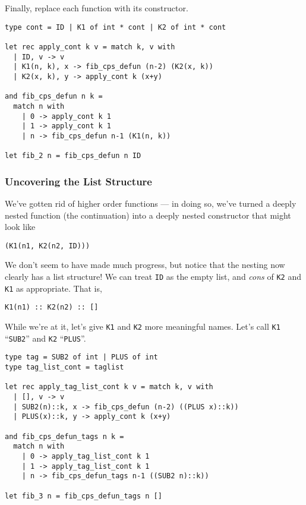 Finally, replace each function with its constructor. 

\begin{code}
\label{code:defun-fib-1}
\begin{verbatim}
type cont = ID | K1 of int * cont | K2 of int * cont

let rec apply_cont k v = match k, v with
  | ID, v -> v
  | K1(n, k), x -> fib_cps_defun (n-2) (K2(x, k))
  | K2(x, k), y -> apply_cont k (x+y)

and fib_cps_defun n k = 
  match n with
    | 0 -> apply_cont k 1
    | 1 -> apply_cont k 1
    | n -> fib_cps_defun n-1 (K1(n, k))

let fib_2 n = fib_cps_defun n ID
\end{verbatim}
\end{code}

\subsubsection{Uncovering the List Structure}
We've gotten rid of higher order functions --- in doing so, we've turned a deeply nested function (the continuation) into a deeply nested constructor that might look like
\begin{verbatim}
(K1(n1, K2(n2, ID)))
\end{verbatim}
We don't seem to have made much progress, but notice that the nesting now clearly has a list structure! We can treat \texttt{ID} as the empty list, and \emph{cons} of \texttt{K2} and \texttt{K1} as appropriate. That is, 
\begin{verbatim}
K1(n1) :: K2(n2) :: []
\end{verbatim}

While we're at it, let's give \texttt{K1} and \texttt{K2} more meaningful names. Let's call \texttt{K1} ``\texttt{SUB2}'' and \texttt{K2} ``\texttt{PLUS}''. 

\begin{code}
\label{code:defun-list-fib}
\begin{verbatim}
type tag = SUB2 of int | PLUS of int
type tag_list_cont = taglist

let rec apply_tag_list_cont k v = match k, v with
  | [], v -> v
  | SUB2(n)::k, x -> fib_cps_defun (n-2) ((PLUS x)::k))
  | PLUS(x)::k, y -> apply_cont k (x+y)

and fib_cps_defun_tags n k = 
  match n with
    | 0 -> apply_tag_list_cont k 1
    | 1 -> apply_tag_list_cont k 1
    | n -> fib_cps_defun_tags n-1 ((SUB2 n)::k))

let fib_3 n = fib_cps_defun_tags n []
\end{verbatim}
\end{code}

